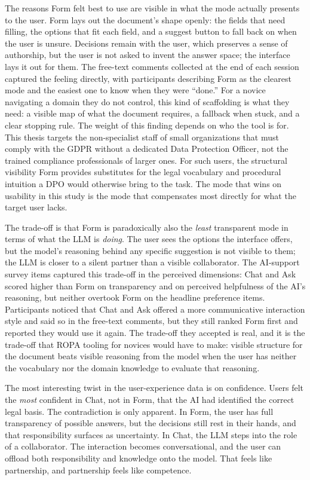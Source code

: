 The reasons Form felt best to use are visible in what the mode
actually presents to the user. Form lays out the document's
shape openly: the fields that need filling, the options that fit
each field, and a suggest button to fall back on when the user
is unsure. Decisions remain with the user, which preserves a
sense of authorship, but the user is not asked to invent the
answer space; the interface lays it out for them. The free-text
comments collected at the end of each session captured the
feeling directly, with participants describing Form as the
clearest mode and the easiest one to know when they were
``done.'' For a novice navigating a domain they do not control,
this kind of scaffolding is what they need: a visible map of
what the document requires, a fallback when stuck, and a clear
stopping rule. The weight of this finding depends on who the
tool is for. This thesis targets the non-specialist staff of
small organizations that must comply with the GDPR without a
dedicated Data Protection Officer, not the trained compliance
professionals of larger ones. For such users, the
structural visibility Form provides substitutes for the legal
vocabulary and procedural intuition a DPO would otherwise
bring to the task. The mode that wins on usability in this
study is the mode that compensates most directly for what the
target user lacks.

The trade-off is that Form is paradoxically also the
\emph{least} transparent mode in terms of what the LLM is
\emph{doing}. The user sees the options the interface offers,
but the model's reasoning behind any specific suggestion is not
visible to them; the LLM is closer to a silent partner than a
visible collaborator. The AI-support survey items captured this
trade-off in the perceived dimensions: Chat and Ask scored higher
than Form on transparency and on perceived helpfulness of the
AI's reasoning, but neither overtook Form on the headline
preference items. Participants noticed that Chat and Ask offered
a more communicative interaction style and said so in the
free-text comments, but they still ranked Form first and reported
they would use it again. The trade-off they accepted is real,
and it is the trade-off that ROPA tooling for novices would
have to make: visible structure for the document beats visible
reasoning from the model when the user has neither the
vocabulary nor the domain knowledge to evaluate that reasoning.

The most interesting twist in the user-experience data is on
confidence. Users felt the \emph{most} confident in Chat, not in
Form, that the AI had identified the correct legal basis. The
contradiction is only apparent. In Form, the user has full
transparency of possible answers, but the decisions still rest
in their hands, and that responsibility surfaces as uncertainty.
In Chat, the LLM steps into the role of a collaborator.
The interaction becomes conversational,
and the user can offload both responsibility and knowledge onto
the model. That feels like partnership, and partnership feels
like competence.

